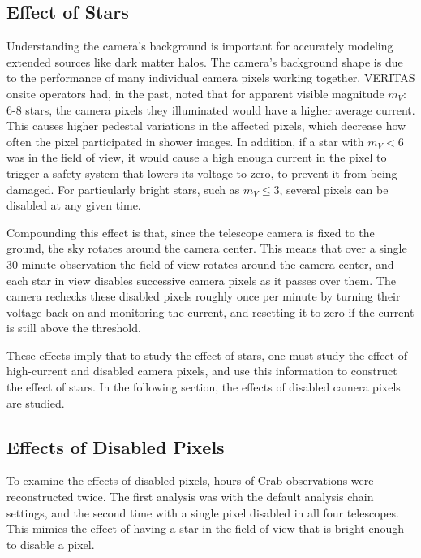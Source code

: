   \FloatBarrier

  \subsection{Effect of Stars}
    Understanding the camera's background is important for accurately modeling extended sources like dark matter halos.
    The camera's background shape is due to the performance of many individual camera pixels working together.
    VERITAS onsite operators had, in the past, noted that for apparent visible magnitude $m_V :$ 6-8 stars, the camera pixels they illuminated would have a higher average current.
    This causes higher pedestal variations in the affected pixels, which decrease how often the pixel participated in shower images.
    In addition, if a star with $m_V < 6$ was in the field of view, it would cause a high enough current in the pixel to trigger a safety system that lowers its voltage to zero, to prevent it from being damaged.
    For particularly bright stars, such as $m_V \leq 3$, several pixels can be disabled at any given time.

    Compounding this effect is that, since the telescope camera is fixed to the ground, the sky rotates around the camera center.
    This means that over a single 30 minute observation the field of view rotates around the camera center, and each star in view disables successive camera pixels as it passes over them.
    The camera rechecks these disabled pixels roughly once per minute by turning their voltage back on and monitoring the current, and resetting it to zero if the current is still above the threshold.

    These effects imply that to study the effect of stars, one must study the effect of high-current and disabled camera pixels, and use this information to construct the effect of stars.
    In the following section, the effects of disabled camera pixels are studied.
    
  \subsection{Effects of Disabled Pixels}

    To examine the effects of disabled pixels,  hours of Crab observations were reconstructed twice.
    The first analysis was with the default analysis chain settings, and the second time with a single pixel disabled in all four telescopes.
    This mimics the effect of having a star in the field of view that is bright enough to disable a pixel.

